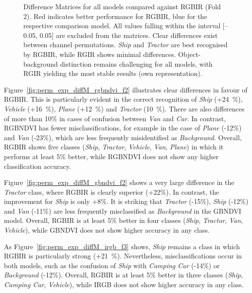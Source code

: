 \begin{figure}[htbp]
    \caption[Difference Matrices compared to \acrshort{RGBIR} (Fold 2)]{Difference Matrices for all models compared against \acrshort{RGBIR} (Fold 2). Red indicates better performance for \acrshort{RGBIR}, blue for the respective comparison model. All values falling within the interval [–0.05, 0.05] are excluded from the matrices. Clear differences exist between channel permutations. \textit{Ship} and \textit{Tractor} are best recognised by \acrshort{RGBIR}, while \acrshort{RGIR} shows minimal differences. Object-background distinction remains challenging for all models, with \acrshort{RGIR} yielding the most stable results (own representation).}
    \label{fig:perm_exp_diffM_all}
\end{figure}



Figure~\ref{fig:perm_exp_diffM_rgbndvi_f2} illustrates clear differences in favour of \acrshort{RGBIR}. This is particularly evident in the correct recognition of \textit{Ship} (+24~\%), \textit{Vehicle} (+16~\%), \textit{Plane} (+12~\%) and \textit{Tractor} (10~\%). There are also differences of more than 10\% in cases of confusion between \textit{Van} and \textit{Car}. In contrast, \acrshort{RGBNDVI} has fewer misclassifications, for example in the case of \textit{Plane} (-12\%) and \textit{Van} (-23\%), which are less frequently misidentified as \textit{Background}. Overall, \acrshort{RGBIR} shows five classes (\textit{Ship}, \textit{Tractor}, \textit{Vehicle}, \textit{Van}, \textit{Plane}) in which it performs at least 5\% better, while \acrshort{RGBNDVI} does not show any higher classification accuracy.


Figure~\ref{fig:perm_exp_diffM_gbndvi_f2} shows a very large difference in the \textit{Tractor} class, where \acrshort{RGBIR} is clearly superior (+22\%). In contrast, the improvement for \textit{Ship} is only +8\%. It is striking that \textit{Tractor} (-15\%), \textit{Ship} (-12\%) and \textit{Van} (-11\%) are less frequently misclassified as \textit{Background} in the \acrshort{GBNDVI} model. Overall, \acrshort{RGBIR} is at least 5\% better in four classes (\textit{Ship}, \textit{Tractor}, \textit{Van}, \textit{Vehicle}), while \acrshort{GBNDVI} does not show higher accuracy in any class.




As Figure~\ref{fig:perm_exp_diffM_irgb_f3} shows, \textit{Ship} remains a class in which \acrshort{RGBIR} is particularly strong (+21~\%). Nevertheless, misclassifications occur in both models, such as the confusion of \textit{Ship} with \textit{Camping Car} (-14\%) or \textit{Background} (-12\%). Overall, \acrshort{RGBIR} is at least 5\% better in three classes (\textit{Ship}, \textit{Camping Car}, \textit{Vehicle}), while \acrshort{IRGB} does not show higher accuracy in any class.




